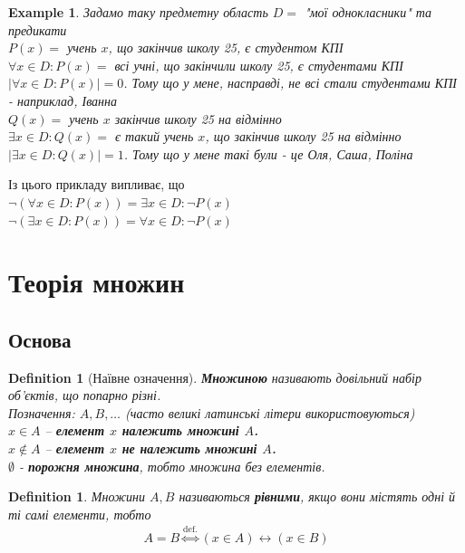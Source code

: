 \documentclass[a4paper, 14pt]{extarticle}
\theoremstyle{theoremdd}
\theoremstyle{theoremdd}
\newtheorem{definition}[theorem]{Definition}
\theoremstyle{theoremdd}
\theoremstyle{theoremdd}
\theoremstyle{theoremdd}
\newtheorem{example}[theorem]{Example}
\theoremstyle{theoremdd}
\theoremstyle{theoremdd}
\theoremstyle{theoremdd}
\theoremstyle{theoremdd}
\theoremstyle{theoremdd}
\theoremstyle{theoremdd}
\theoremstyle{theoremdd}
\theoremstyle{theoremdd}
\theoremstyle{theoremdd}
\theoremstyle{theoremdd}
\begin{document}
\begin{example}
Задамо таку предметну область $D = $ "мої однокласники" та предикати\\
$P(x) = $ учень $x$, що закінчив школу 25, є студентом КПІ\\
$\forall x \in D: P(x) = $ всі учні, що закінчили школу 25, є студентами КПІ\\
$|\forall x \in D: P(x)| = 0$. Тому що у мене, насправді, не всі стали студентами КПІ - наприклад, Іванна\\
$Q(x) = $ учень $x$ закінчив школу 25 на відмінно\\
$\exists x \in D: Q(x) =$ є такий учень $x$, що закінчив школу 25 на відмінно\\
$|\exists x \in D: Q(x)| = 1$. Тому що у мене такі були - це Оля, Саша, Поліна
\end{example}

Із цього прикладу випливає, що\\
$\neg (\forall x \in D: P(x)) = \exists x \in D: \neg P(x)$\\
$\neg (\exists x \in D: P(x)) = \forall x \in D: \neg P(x)$\\
\newpage

\section{Теорія множин}
\subsection{Основа}
\begin{definition}[Наївне означення]
\textbf{Множиною} називають довільний набір об'єктів, що попарно різні.\\
Позначення: $A,B,\dots$ (часто великі латинські літери використовуються)
\bigskip \\
$x \in A$ -- \textbf{елемент $x$ належить множині $A$.}\\
$x \notin A$ -- \textbf{елемент $x$ не належить множині $A$.}\\
$\emptyset$ - \textbf{порожня множина}, тобто множина без елементів.
\end{definition}

\begin{definition}
Множини $A,B$ називаються \textbf{рівними}, якщо вони містять одні й ті самі елементи, тобто
\begin{align*}
A = B \overset{\text{def.}}{\iff} (x \in A) \leftrightarrow (x \in B)
\end{align*}
\end{definition}
\end{document}
